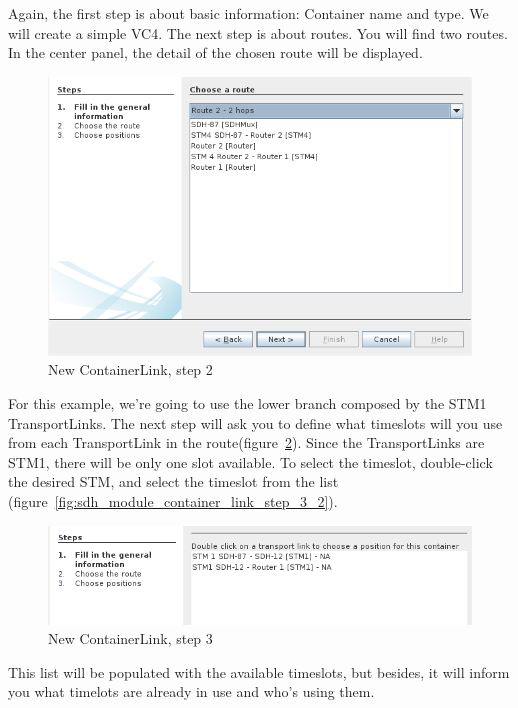 \documentclass[a4paper]{article}
\begin{document}
		Again, the first step is about basic information: Container name and type. We will create a simple VC4. The next step is about routes. You will find two routes. In the center panel, the detail of the chosen route will be displayed.
		\begin{figure}[h!]
			\centering
			\includegraphics[width=\linewidth]{img/sdh_module_container_link_step_2.png}
			\caption{New ContainerLink, step 2}
			\label{fig:sdh_module_container_link_step_2}
		\end{figure}
		\newpage
		For this example, we're going to use the lower branch composed by the STM1 TransportLinks. The next step will ask you to define what timeslots will you use from each TransportLink in the route(figure~\ref{fig:sdh_module_container_link_step_3}). Since the TransportLinks are STM1, there will be only one slot available. To select the timeslot, double-click the desired STM, and select the timeslot from the list (figure~\ref{fig:sdh_module_container_link_step_3_2}).
		\begin{figure}[h!]
			\centering
			\includegraphics[width=\linewidth]{img/sdh_module_container_link_step_3.png}
			\caption{New ContainerLink, step 3}
			\label{fig:sdh_module_container_link_step_3}
		\end{figure}
		\newpage
		This list will be populated with the available timeslots, but besides, it will inform you what timelots are already in use and who's using them.
\end{document}
